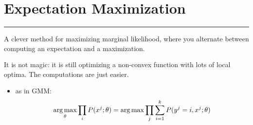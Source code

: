 \section{Expectation Maximization}
\smallskip \hrule height 2pt \smallskip

A clever method for maximizing marginal likelihood, where you alternate between computing an expectation and a maximization. 

It is not magic: it is still optimizing a non-convex function with lots of local optima.  The computations are just easier. 

\begin{itemize}
	\item as in GMM: $$ \operatorname*{arg\,max}_{\theta} \prod_i P(x^j; \theta) = \operatorname*{arg\,max} \prod_j \sum_{i=1}^k P(y^j=i, x^j; \theta) $$

\end{itemize}